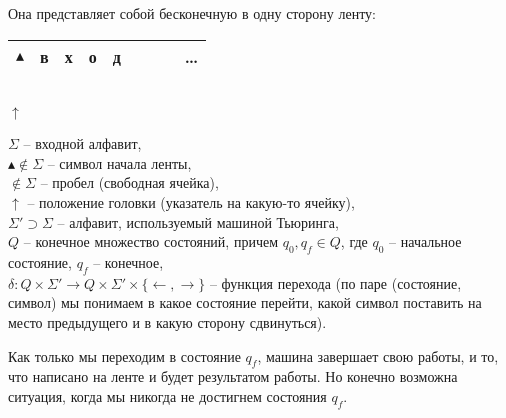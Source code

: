 Она представляет собой бесконечную в одну сторону ленту:
\begin{center}
    \begin{tabular}{|c|c|c|c|c|c|c|c|c|}
        \hline
        $\blacktriangle$ & в & х & о & д & \textvisiblespace & \textvisiblespace & \textvisiblespace & \dots \\
        \hline
    \end{tabular}\\
    $\uparrow$
\end{center}
$\Sigma$ -- входной алфавит,\\$\blacktriangle \notin \Sigma$ -- символ начала ленты,\\ \textvisiblespace$ \notin \Sigma$ -- пробел (свободная ячейка),\\$\uparrow$ -- положение головки (указатель на какую-то ячейку),\\
$\Sigma' \supset \Sigma$ -- алфавит, используемый машиной Тьюринга, \\
$Q$ -- конечное множество состояний, причем $q_0, q_f \in Q$, где $q_0$ -- начальное состояние, $q_f$ -- конечное,\\
$\delta: Q \times \Sigma' \to Q \times \Sigma' \times \{\leftarrow, \rightarrow \}$ -- функция перехода (по паре (состояние, символ) мы понимаем в какое состояние перейти, какой символ поставить на место предыдущего и в какую сторону сдвинуться).

Как только мы переходим в состояние $q_f$, машина завершает свою работы, и то, что написано на ленте и будет результатом работы. Но конечно возможна ситуация, когда мы никогда не достигнем состояния $q_f$. 

